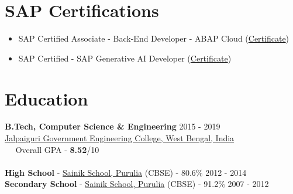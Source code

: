 \documentclass[margin, centered, a4paper]{res}
\begin{document}
\begin{resume}
\section{SAP Certifications}
\begin{itemize}[leftmargin=*]
	\item SAP Certified Associate - Back-End Developer - ABAP Cloud (\href{https://www.credly.com/badges/34b26901-f992-4192-9ba6-2a1444306de0/public_url}{Certificate})
	\item SAP Certified - SAP Generative AI Developer (\href{https://www.credly.com/badges/7993cc61-c2d1-481a-88d8-69897684e130/public_url}{Certificate})
\end{itemize}

\section{Education}
\textbf{B.Tech, Computer Science \& Engineering} \hfill 2015 - 2019 \\
\href{http://jgec.ac.in/}{Jalpaiguri Government Engineering College, West Bengal, India} \\
~\textbullet~ Overall GPA - \textbf{8.52}/10
\\
\\
\textbf{High School} - \href{http://sainikschoolpurulia.com/}{Sainik School, Purulia} (CBSE) - 80.6\% \hfill 2012 - 2014 \\
\textbf{Secondary School} - \href{http://sainikschoolpurulia.com/}{Sainik School, Purulia} (CBSE) - 91.2\% \hfill 2007 - 2012


\end{resume}
\end{document}
